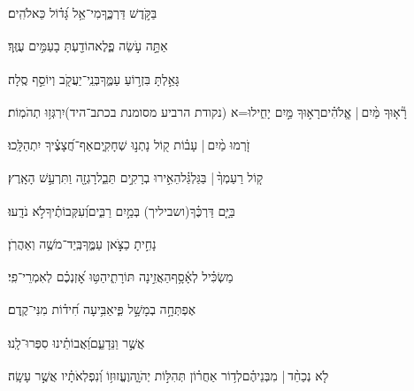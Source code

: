 \documentclass[12pt]{article}
\newcommand{\kri}[1]{\ledsidenote{\small{#1}}}	%
\newcommand{\loc}[1]{\textsuperscript{\locf{#1}}}
\begin{document}
{\loc{ יד}~}‏ בַּקֹּ֣דֶשׁ דַּרְכֶּ֑ךָ{\hfill}מִי־אֵ֥ל גָּ֝ד֗וֹל כֵּאלֹהִֽים׃\par

{\loc{ טו}~}‏אַתָּ֣ה  עֹ֣שֵׂה פֶ֑לֶא{\hfill}הוֹדַ֖עְתָּ בָעַמִּ֣ים עֻזֶּֽךָ׃\par

{\loc{ טז}~}‏גָּאַ֣לְתָּ בִּזְר֣וֹעַ עַמֶּ֑ךָ{\hfill}בְּנֵֽי־יַעֲקֹ֖ב וְיוֹסֵ֣ף סֶֽלָה׃\par

{\loc{ יז}~}‏רָ֘א֤וּךָ מַּ֨יִם |  אֱֽלֹהִ֗ים{\hfill}רָא֣וּךָ מַּ֣יִם יָחִ֑ילוּ\newline\hspace*{.5em}=א (נקודת הרביע מסומנת בכתב־היד){\hfill}יִרְגְּז֥וּ תְהֹמֽוֹת׃\par

{\loc{ יח}~}‏זֹ֤רְמוּ מַ֨יִם |  עָב֗וֹת ק֭וֹל נָתְנ֣וּ שְׁחָקִ֑ים{\hfill}אַף־חֲ֝צָצֶ֗יךָ יִתְהַלָּֽכוּ׃\par

{\loc{ יט}~}‏ק֤וֹל רַעַמְךָ֨ | {\hfill}בַּגַּלְגַּ֗ל\newline\hspace*{.5em}הֵאִ֣ירוּ בְרָקִ֣ים תֵּבֵ֑ל{\hfill}רָגְזָ֖ה וַתִּרְעַ֣שׁ הָאָֽרֶץ׃\par

{\loc{ כ}~}‏בַּיָּ֤ם דַּרְכֶּ֗ךָ{\hfill}(ושביליך)\kri{} בְּמַ֣יִם רַבִּ֑ים\newline\hspace*{.5em}וְ֝עִקְּבוֹתֶ֗יךָ{\hfill}לֹ֣א נֹדָֽעוּ׃\par

{\loc{ כא}~}‏נָחִ֣יתָ כַצֹּ֣אן עַמֶּ֑ךָ{\hfill}בְּֽיַד־מֹשֶׁ֥ה וְאַהֲרֹֽן׃\par\pend
\ledpb
\pstart[\subsection*{\textcolor{red}{פרק עח}}]\label{פרק עח}
{\loc{ א}~}‏מַשְׂכִּ֗יל לְאָ֫סָ֥ף\newline\hspace*{.5em}הַאֲזִ֣ינָה  תּוֹרָתִ֑י{\hfill}הַטּ֥וּ אׇ֝זְנְכֶ֗ם לְאִמְרֵי־פִֽי׃\par

{\loc{ ב}~}‏אֶפְתְּחָ֣ה בְמָשָׁ֣ל פִּ֑י{\hfill}אַבִּ֥יעָה חִ֝יד֗וֹת מִנִּי־קֶֽדֶם׃\par

{\loc{ ג}~}‏אֲשֶׁ֣ר  וַנֵּדָעֵ֑ם{\hfill}וַ֝אֲבוֹתֵ֗ינוּ סִפְּרוּ־לָֽנוּ׃\par

{\loc{ ד}~}‏לֹ֤א נְכַחֵ֨ד |  מִבְּנֵיהֶ֗ם{\hfill}לְד֥וֹר אַחֲר֗וֹן\newline\hspace*{.5em} תְּהִלּ֣וֹת יְהֹוָ֑ה{\hfill}וֶעֱזוּז֥וֹ וְ֝נִפְלְאֹתָ֗יו אֲשֶׁ֣ר עָשָֽׂה׃\par
\end{document}
